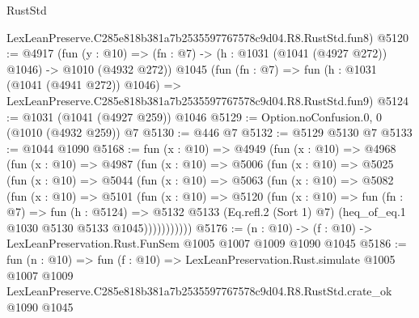\begin{lexlean}{RustStd}
\begin{coremodule}
    LexLeanPreserve.C285e818b381a7b2535597767578c9d04.R8.RustStd.fun8)
@5120 := @4917
    (fun (y : @10) => (fn : @7) -> (h : @1031 (@1041 (@4927 @272)) @1046) -> @1010 (@4932 @272))
    @1045
    (fun (fn : @7) =>
    fun (h : @1031 (@1041 (@4941 @272)) @1046) =>
    LexLeanPreserve.C285e818b381a7b2535597767578c9d04.R8.RustStd.fun9)
@5124 := @1031 (@1041 (@4927 @259)) @1046
@5129 := Option.noConfusion.{0, 0} (@1010 (@4932 @259)) @7
@5130 := @446 @7
@5132 := @5129 @5130 @7
@5133 := @1044 @1090
@5168 := fun (x : @10) =>
  @4949
    (fun (x : @10) =>
    @4968
      (fun (x : @10) =>
      @4987
        (fun (x : @10) =>
        @5006
          (fun (x : @10) =>
          @5025
            (fun (x : @10) =>
            @5044
              (fun (x : @10) =>
              @5063
                (fun (x : @10) =>
                @5082
                  (fun (x : @10) =>
                  @5101
                    (fun (x : @10) =>
                    @5120
                      (fun (x : @10) =>
                      fun (fn : @7) =>
                      fun (h : @5124) =>
                      @5132
                        @5133
                        (Eq.refl.{2} (Sort 1) @7)
                        (heq_of_eq.{1} @1030 @5130 @5133 @1045)))))))))))
@5176 := (n : @10) -> (f : @10) -> LexLeanPreservation.Rust.FunSem @1005 @1007 @1009 @1090 @1045
@5186 := fun (n : @10) =>
  fun (f : @10) =>
  LexLeanPreservation.Rust.simulate
    @1005
    @1007
    @1009
    LexLeanPreserve.C285e818b381a7b2535597767578c9d04.R8.RustStd.crate_ok
    @1090
    @1045
\end{coremodule}
\end{lexlean}
